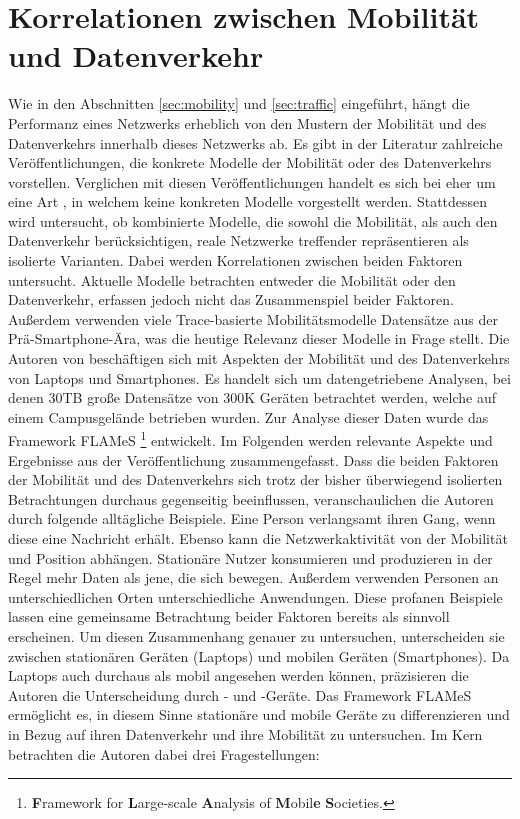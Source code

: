 \documentclass[12pt, a4paper]{article}
\begin{document}
\section{Korrelationen zwischen Mobilität und Datenverkehr}
\label{sec:correlations}

Wie in den Abschnitten \ref{sec:mobility} und \ref{sec:traffic} eingeführt, hängt die Performanz eines
Netzwerks erheblich von den Mustern der Mobilität und des Datenverkehrs innerhalb dieses Netzwerks ab.
Es gibt in der Literatur zahlreiche Veröffentlichungen, die konkrete Modelle der Mobilität oder des Datenverkehrs
vorstellen. Verglichen mit diesen Veröffentlichungen handelt es sich bei \cite{Alipour2018} eher um eine Art 
, in welchem keine konkreten Modelle vorgestellt werden. Stattdessen wird untersucht, 
ob kombinierte Modelle, die sowohl die Mobilität, als auch den Datenverkehr berücksichtigen, reale Netzwerke 
treffender repräsentieren als isolierte Varianten. Dabei werden Korrelationen zwischen beiden Faktoren untersucht.\newline
Aktuelle Modelle betrachten entweder die Mobilität oder den Datenverkehr, erfassen jedoch nicht das Zusammenspiel beider Faktoren.
Außerdem verwenden viele Trace-basierte Mobilitätsmodelle Datensätze aus der Prä-Smartphone-Ära,
was die heutige Relevanz dieser Modelle in Frage stellt. \cite{Alipour2018}
Die Autoren von \cite{Alipour2018} beschäftigen sich mit Aspekten der Mobilität und des Datenverkehrs von Laptops und Smartphones.
Es handelt sich um datengetriebene Analysen, bei denen $30$\textsc{TB} große Datensätze von $300$\textsc{K} Geräten betrachtet werden,
welche auf einem Campusgelände betrieben wurden. Zur Analyse dieser Daten wurde das Framework FLAMeS \footnote{\textbf{F}ramework for 
\textbf{L}arge-scale \textbf{A}nalysis of \textbf{M}obil\textbf{e} \textbf{S}ocieties.} entwickelt.
Im Folgenden werden relevante Aspekte und Ergebnisse aus der Veröffentlichung zusammengefasst.\newline\newline
Dass die beiden Faktoren der Mobilität und des Datenverkehrs sich trotz der bisher überwiegend isolierten Betrachtungen
durchaus gegenseitig beeinflussen, veranschaulichen die Autoren durch folgende alltägliche Beispiele. 
Eine Person verlangsamt ihren Gang, wenn diese eine Nachricht erhält. Ebenso kann die Netzwerkaktivität von der
Mobilität und Position abhängen. Stationäre Nutzer konsumieren und produzieren in der Regel mehr Daten als jene, 
die sich bewegen. Außerdem verwenden Personen an unterschiedlichen Orten unterschiedliche Anwendungen.
Diese profanen Beispiele lassen eine gemeinsame Betrachtung beider Faktoren bereits als sinnvoll erscheinen.
Um diesen Zusammenhang genauer zu untersuchen, unterscheiden sie zwischen stationären Geräten (Laptops) und mobilen Geräten
(Smartphones). Da Laptops auch durchaus als mobil angesehen werden können, präzisieren die Autoren die Unterscheidung
durch - und -Geräte. Das Framework FLAMeS ermöglicht es, 
in diesem Sinne stationäre und mobile Geräte zu differenzieren und in Bezug auf ihren Datenverkehr und ihre 
Mobilität zu untersuchen. Im Kern betrachten die Autoren dabei drei Fragestellungen:
\end{document}
